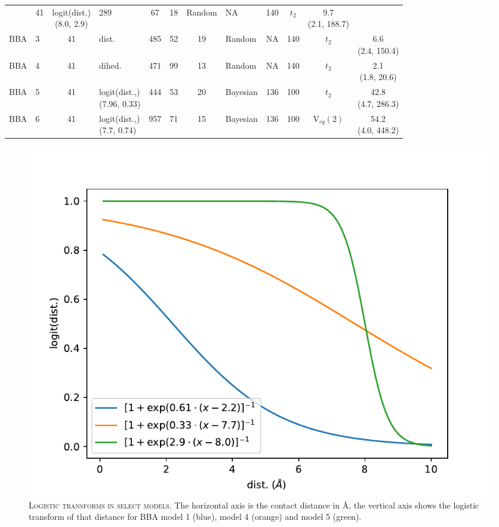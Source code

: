 \documentclass{article}
\begin{document}
\begin{landscape}
\begin{table}
\begin{tabularx}{\hsize}{llclccclcccc}
     
     
     
     & 41 & \makecell[tl]{logit(dist.) \\(8.0, 2.9)} & 289 & 67 & 18 & Random & NA & 140 & $t_{2}$ & \makecell[tc]{9.7 \\ (2.1, 188.7)}  \\
     BBA          & 3 & 41 & dist. & 485 & 52 & 19 & Random & NA & 140 & $t_{2}$ & \makecell[tc]{6.6 \\ (2.4, 150.4)}  \\
     BBA          & 4 & 41 & dihed. & 471 & 99 & 13 & Random & NA & 140 & $t_{2}$ & \makecell[tc]{2.1 \\ (1.8, 20.6)} \\
     BBA          & 5 & 41 & \makecell[tl]{logit(dist.,)\\(7.96, 0.33)} & 444 & 53 & 20 & Bayesian & 136 & 100 & $t_{2}$ &\makecell[tc]{42.8 \\ (4.7, 286.3)}  \\
    
     BBA          & 6 & 41 & \makecell[tl]{logit(dist.,)\\(7.7, 0.74)} & 957 & 71 & 15 & Bayesian & 136 & 100 & V$_{eq}(2)$ &\makecell[tc]{54.2 \\ (4.0, 448.2)}  \\
     
    \bottomrule
    \end{tabularx}
    \label{si_tab:modelsummaries}
\end{table}


\end{landscape}

\begin{figure}[h]
    \centering
    \includegraphics[height=0.25\textheight]{SI_figures/transforms.pdf}
    \caption{\textsc{Logistic transforms in select models.} The horizontal axis is the contact distance in \si{\angstrom}, the vertical axis shows the logistic transform of that distance for BBA model 1 (blue), model 4 (orange) and model 5 (green). }
    \label{fig:transforms}
\end{figure}
\end{document}
